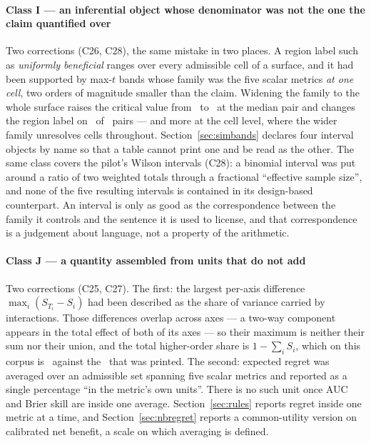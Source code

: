 \paragraph{Class I --- an inferential object whose denominator was not the
one the claim quantified over}
Two corrections (C26, C28), the same mistake in two places. A region label
such as \emph{uniformly beneficial} ranges over every admissible cell of a
surface, and it had been supported by max-$t$ bands whose family was the five
scalar metrics \emph{at one cell}, two orders of magnitude smaller than
the claim. Widening the family to the whole surface raises the critical value
from \maxTWithinMedian\ to \maxTSurfaceMedian\ at the median pair and changes
the region label on \nRegionChangedByFamily\ of \nPairs\ pairs --- and more at
the cell level, where the wider family unresolves cells throughout.
Section~\ref{sec:simbands} declares four interval objects by name so that a
table cannot print one and be read as the other. The same class covers the
pilot's Wilson intervals (C28): a binomial interval was put around a ratio of
two weighted totals through a fractional ``effective sample size'', and none
of the five resulting intervals is contained in its design-based counterpart.
An interval is only as good as the correspondence between the family it
controls and the sentence it is used to license, and that correspondence is a
judgement about language, not a property of the arithmetic.

\paragraph{Class J --- a quantity assembled from units that do not add}
Two corrections (C25, C27). The first: the largest per-axis difference
$\max_i(S_{T_i} - S_i)$ had been described as the share of variance carried by
interactions. Those differences overlap across axes --- a two-way component
appears in the total effect of both of its axes --- so their maximum is
neither their sum nor their union, and the total higher-order share is
$1 - \sum_i S_i$, which on this corpus is \interactionTotalPct\ against the
\largestInvolvementPct\ that was printed. The second: expected regret was
averaged over an admissible set spanning five scalar metrics and reported
as a single percentage ``in the metric's own units''. There is no such unit
once AUC and Brier skill are inside one average. Section~\ref{sec:rules}
reports regret inside one metric at a time, and
Section~\ref{sec:nbregret} reports a common-utility version on calibrated net
benefit, a scale on which averaging is defined.

